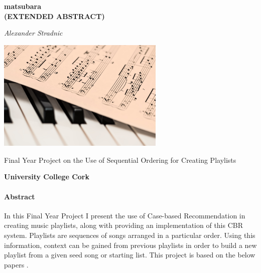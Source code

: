 \documentclass[a4paper, 12pt]{article}
\begin{document}
\begin{titlepage}
    \begin{center}
        \vspace*{1cm}

        \huge
        \textbf{matsubara\\ (EXTENDED ABSTRACT)}

        \vspace{1cm}

        \textit{Alexander Stradnic}

        \vspace{3cm}

        \includegraphics[width=0.6\textwidth]{"piano.jpg"}

        \vfill

        \textsf{Final Year Project on the Use of Sequential Ordering for Creating Playlists}

        \vspace{1cm}

        \textbf{University College Cork}

        \vspace*{1cm}

    \end{center}
\end{titlepage}

\paragraph{Abstract}
In this Final Year Project I present the use of Case-based Recommendation in creating music playlists, 
along with providing an implementation of this CBR system.
Playlists are sequences of songs arranged in a particular order. Using this information, 
context can be gained from previous playlists in order to build a new playlist from a given seed song or starting list.
This project is based on the below papers \cite{1, 2}.
\end{document}
